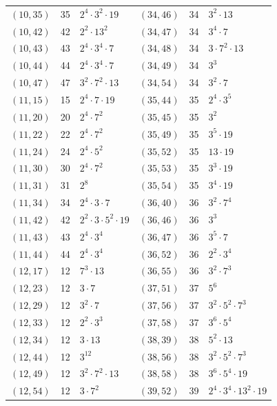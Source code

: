 \documentclass[11pt]{article}
\begin{document}
\begin{longtable}{@{}lrl@{\qquad}lrl@{}}
$(10,35)$ & 35 & $2^{4}\cdot 3^{2}\cdot 19$ & $(34,46)$ & 34 & $3^{2}\cdot 13$\\
$(10,42)$ & 42 & $2^{2}\cdot 13^{2}$ & $(34,47)$ & 34 & $3^{4}\cdot 7$\\
$(10,43)$ & 43 & $2^{4}\cdot 3^{4}\cdot 7$ & $(34,48)$ & 34 & $3\cdot 7^{2}\cdot 13$\\
$(10,44)$ & 44 & $2^{4}\cdot 3^{4}\cdot 7$ & $(34,49)$ & 34 & $3^{3}$\\
$(10,47)$ & 47 & $3^{2}\cdot 7^{2}\cdot 13$ & $(34,54)$ & 34 & $3^{2}\cdot 7$\\
$(11,15)$ & 15 & $2^{4}\cdot 7\cdot 19$ & $(35,44)$ & 35 & $2^{4}\cdot 3^{5}$\\
$(11,20)$ & 20 & $2^{4}\cdot 7^{2}$ & $(35,45)$ & 35 & $3^{2}$\\
$(11,22)$ & 22 & $2^{4}\cdot 7^{2}$ & $(35,49)$ & 35 & $3^{5}\cdot 19$\\
$(11,24)$ & 24 & $2^{4}\cdot 5^{2}$ & $(35,52)$ & 35 & $13\cdot 19$\\
$(11,30)$ & 30 & $2^{4}\cdot 7^{2}$ & $(35,53)$ & 35 & $3^{3}\cdot 19$\\
$(11,31)$ & 31 & $2^{8}$ & $(35,54)$ & 35 & $3^{4}\cdot 19$\\
$(11,34)$ & 34 & $2^{4}\cdot 3\cdot 7$ & $(36,40)$ & 36 & $3^{2}\cdot 7^{4}$\\
$(11,42)$ & 42 & $2^{2}\cdot 3\cdot 5^{2}\cdot 19$ & $(36,46)$ & 36 & $3^{3}$\\
$(11,43)$ & 43 & $2^{4}\cdot 3^{4}$ & $(36,47)$ & 36 & $3^{5}\cdot 7$\\
$(11,44)$ & 44 & $2^{4}\cdot 3^{4}$ & $(36,52)$ & 36 & $2^{2}\cdot 3^{4}$\\
$(12,17)$ & 12 & $7^{3}\cdot 13$ & $(36,55)$ & 36 & $3^{2}\cdot 7^{3}$\\
$(12,23)$ & 12 & $3\cdot 7$ & $(37,51)$ & 37 & $5^{6}$\\
$(12,29)$ & 12 & $3^{2}\cdot 7$ & $(37,56)$ & 37 & $3^{2}\cdot 5^{2}\cdot 7^{3}$\\
$(12,33)$ & 12 & $2^{2}\cdot 3^{3}$ & $(37,58)$ & 37 & $3^{6}\cdot 5^{4}$\\
$(12,34)$ & 12 & $3\cdot 13$ & $(38,39)$ & 38 & $5^{2}\cdot 13$\\
$(12,44)$ & 12 & $3^{12}$ & $(38,56)$ & 38 & $3^{2}\cdot 5^{2}\cdot 7^{3}$\\
$(12,49)$ & 12 & $3^{2}\cdot 7^{2}\cdot 13$ & $(38,58)$ & 38 & $3^{6}\cdot 5^{4}\cdot 19$\\
$(12,54)$ & 12 & $3\cdot 7^{2}$ & $(39,52)$ & 39 & $2^{4}\cdot 3^{4}\cdot 13^{2}\cdot 19$\\

\end{longtable}
\end{document}
